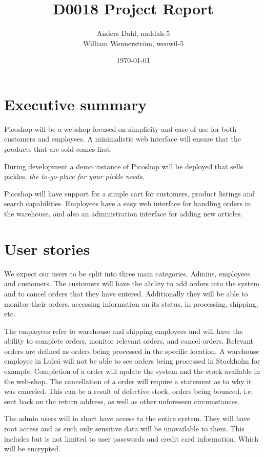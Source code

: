 \documentclass{article}
\title{D0018 Project Report}
\author{Anders Dahl, naddah-5\\
William Wennerström, wenwil-5}
\date{\today}
\begin{document}
\maketitle
\newpage

\tableofcontents
\newpage

\section{Executive summary}
Picoshop will be a webshop focused on simplicity and ease of use for both customers and employees. A minimalistic web interface will ensure that the products that are sold comes first.

During development a demo instance of Picoshop will be deployed that sells pickles, \textit{the to-go-place for your pickle needs}.

Picoshop will have support for a simple cart for customers, product listings and search capabilities. Employees have a easy web interface for handling orders in the warehouse, and also an administration interface for adding new articles.

\section{User stories}
We expect our users to be split into three main categories. Admins, employees and customers. The customers will have the ability to add orders into the system and to cancel orders that they have entered. Additionally they will be able to monitor their orders, accessing information on its status, in processing, shipping, etc. 

The employees refer to warehouse and shipping employees and will have the ability to complete orders, monitor relevant orders, and cancel orders. Relevant orders are defined as orders being processed in the specific location. A warehouse employee in Luleå will not be able to see orders being processed in Stockholm for example. Completion of a order will update the system and the stock available in the web-shop. The cancellation of a order will require a statement as to why it was canceled. This can be a result of defective stock, orders being bounced, i.e. sent back on the return address, as well as other unforeseen circumstances.

The admin users will in short have access to the entire system. They will have root access and as such only sensitive data will be unavailable to them. This includes but is not limited to user passwords and credit card information. Which will be encrypted.
\newpage
\end{document}
